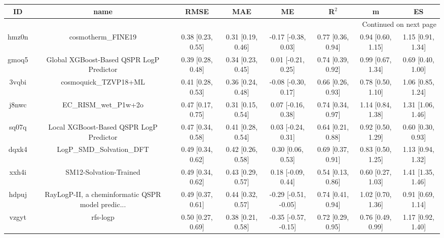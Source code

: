 \documentclass{article}
\begin{document}
\begin{center}
\begin{longtable}{|cccccccc|}
\toprule
    ID &                                               name &               RMSE &                MAE &                    ME &              R$^2$ &                    m &                    ES \\
\midrule
\endhead
\midrule
\multicolumn{8}{r}{{Continued on next page}} \\
\midrule
\endfoot

\bottomrule
\endlastfoot
 hmz0n &                                 cosmotherm\_FINE19 &  0.38 [0.23, 0.55] &  0.31 [0.19, 0.46] &   -0.17 [-0.38, 0.03] &  0.77 [0.36, 0.94] &    0.94 [0.60, 1.15] &     1.15 [0.91, 1.34] \\
 gmoq5 &           Global XGBoost-Based QSPR LogP Predictor &  0.39 [0.28, 0.48] &  0.34 [0.23, 0.45] &    0.01 [-0.21, 0.25] &  0.74 [0.39, 0.92] &    0.99 [0.67, 1.34] &     0.69 [0.40, 1.00] \\
 3vqbi &                              cosmoquick\_TZVP18+ML &  0.41 [0.28, 0.53] &  0.36 [0.24, 0.48] &   -0.08 [-0.30, 0.17] &  0.66 [0.26, 0.93] &    0.78 [0.50, 1.10] &     1.06 [0.85, 1.24] \\
 j8nwc &                              EC\_RISM\_wet\_P1w+2o &  0.47 [0.17, 0.75] &  0.31 [0.15, 0.54] &    0.07 [-0.16, 0.38] &  0.74 [0.34, 0.97] &    1.14 [0.84, 1.38] &     1.31 [1.06, 1.46] \\
 sq07q &            Local XGBoost-Based QSPR LogP Predictor &  0.47 [0.34, 0.58] &  0.41 [0.28, 0.54] &    0.03 [-0.24, 0.31] &  0.64 [0.21, 0.88] &    0.92 [0.50, 1.29] &     0.60 [0.30, 0.93] \\
 dqxk4 &                          LogP\_SMD\_Solvation\_DFT &  0.49 [0.34, 0.62] &  0.42 [0.26, 0.58] &     0.30 [0.06, 0.53] &  0.69 [0.37, 0.91] &    0.83 [0.50, 1.25] &     1.13 [0.94, 1.32] \\
 xxh4i &                             SM12-Solvation-Trained &  0.49 [0.34, 0.62] &  0.43 [0.29, 0.57] &    0.18 [-0.09, 0.44] &  0.54 [0.13, 0.86] &    0.60 [0.27, 1.03] &     1.41 [1.35, 1.46] \\
 hdpuj &  RayLogP-II, a cheminformatic QSPR model predic... &  0.49 [0.37, 0.61] &  0.44 [0.32, 0.57] &  -0.29 [-0.51, -0.05] &  0.74 [0.41, 0.94] &    1.02 [0.70, 1.36] &     0.91 [0.69, 1.14] \\
 vzgyt &                                           rfs-logp &  0.50 [0.27, 0.69] &  0.38 [0.21, 0.58] &  -0.35 [-0.57, -0.15] &  0.72 [0.29, 0.95] &    0.76 [0.49, 0.99] &     1.17 [0.92, 1.40] \\

\end{longtable}
\end{center}
\end{document}
